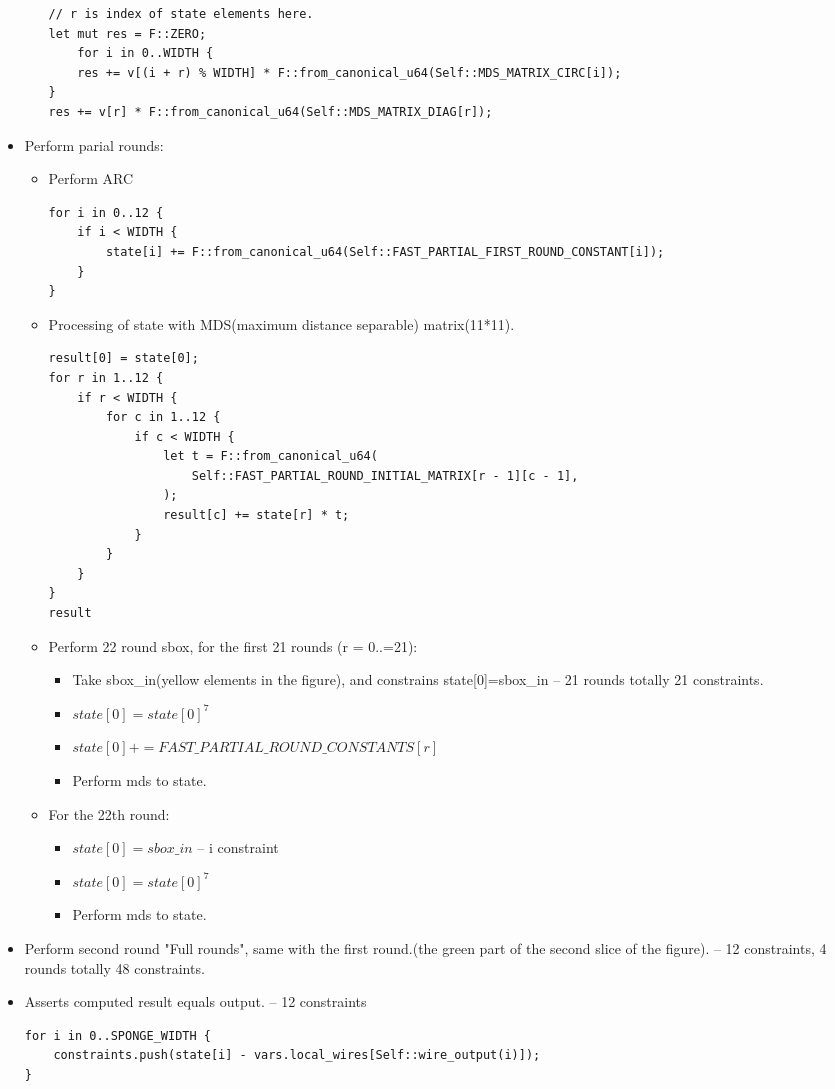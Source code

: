 \begin{itemize}
\begin{itemize}
\begin{lstlisting}
// r is index of state elements here.
let mut res = F::ZERO;
    for i in 0..WIDTH {
    res += v[(i + r) % WIDTH] * F::from_canonical_u64(Self::MDS_MATRIX_CIRC[i]);
}
res += v[r] * F::from_canonical_u64(Self::MDS_MATRIX_DIAG[r]);
        \end{lstlisting}
    \end{itemize}
    \item Perform parial rounds:
    \begin{itemize}
        \item Perform ARC
        \begin{lstlisting}
for i in 0..12 {
    if i < WIDTH {
        state[i] += F::from_canonical_u64(Self::FAST_PARTIAL_FIRST_ROUND_CONSTANT[i]);
    }
}
        \end{lstlisting}
        \item Processing of state with MDS(maximum distance separable) matrix(11*11).
        \begin{lstlisting}
result[0] = state[0];
for r in 1..12 {
    if r < WIDTH {
        for c in 1..12 {
            if c < WIDTH {
                let t = F::from_canonical_u64(
                    Self::FAST_PARTIAL_ROUND_INITIAL_MATRIX[r - 1][c - 1],
                );
                result[c] += state[r] * t;
            }
        }
    }
}
result
        \end{lstlisting}
        \item Perform 22 round sbox, for the first 21 rounds (r = 0..=21):
        \begin{itemize}
            \item Take sbox\_in(yellow elements in the figure), and constrains state[0]=sbox\_in -- 21 rounds totally 21 constraints.
            \item $state[0] =state[0]^7$
            \item $state[0] += FAST\_PARTIAL\_ROUND\_CONSTANTS[r]$
            \item Perform mds to state.
        \end{itemize}
        \item For the 22th round:
        \begin{itemize}
            \item $state[0] = sbox\_in$ -- i constraint
            \item $state[0] =state[0]^7$
            \item Perform mds to state.
        \end{itemize}
    \end{itemize}
    \item Perform second round "Full rounds", same with the first round.(the green part of the second slice of the figure). -- 12 constraints, 4 rounds totally 48 constraints.
    \item Asserts computed result equals output. -- 12 constraints
    \begin{lstlisting}
for i in 0..SPONGE_WIDTH {
    constraints.push(state[i] - vars.local_wires[Self::wire_output(i)]);
}
    \end{lstlisting}
\end{itemize}